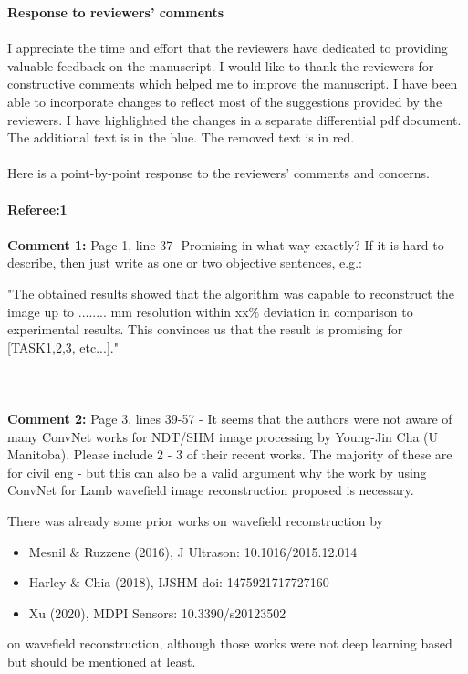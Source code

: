 \documentclass[11pt,a4paper]{article}
\begin{document}
	\textbf{Response to reviewers' comments} 
	\\ \\
	I appreciate the time and effort that the reviewers have dedicated to providing valuable feedback on the manuscript. I would like to thank the reviewers for constructive comments which helped me to improve the manuscript. I have been able to incorporate changes to reflect most of the suggestions provided by the reviewers. I have highlighted the changes in a separate differential pdf document. The additional text is in the blue. The removed text is in red.
	\\ \\
	Here is a point-by-point response to the reviewers' comments and concerns.
	\\ \\
	\underline{\textbf{Referee:1}}
	\\
	\\
	\textbf{Comment 1:} Page 1, line 37- Promising in what way exactly? If it is hard to describe, then just write as one or two objective sentences, e.g.:
	
	"The obtained results showed that the algorithm was capable to reconstruct the image up to ........ mm resolution within xx\% deviation in comparison to experimental results. This convinces us that the result is promising for [TASK1,2,3, etc...]."
	\\ \\
	\\ \\
	\color{black}\textbf{Comment 2:} Page 3, lines 39-57 - It seems that the authors were not aware of many ConvNet works for NDT/SHM image processing by Young-Jin Cha (U Manitoba). 
	Please include 2 - 3 of their recent works. The majority of these are for civil eng - but this can also be a valid argument why the work by using ConvNet for Lamb wavefield image reconstruction proposed is necessary.
	
	There was already some prior works on wavefield reconstruction by
	\begin{itemize}
		\item Mesnil \& Ruzzene (2016), J Ultrason: 10.1016/2015.12.014
		\item Harley \& Chia (2018), IJSHM doi: 1475921717727160
		\item Xu (2020), MDPI Sensors: 10.3390/s20123502
	\end{itemize}
	on wavefield reconstruction, although those works were not deep learning based but should be mentioned at least.
	
\end{document}
